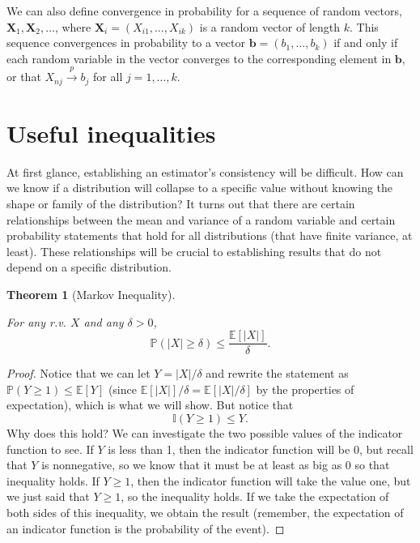 \documentclass[
  letterpaper,
  DIV=11,
  numbers=noendperiod]{scrreprt}
\newcommand{\mb}{\symbf}
\newcommand{\E}{\mathbb{E}}
\renewcommand{\P}{\mathbb{P}}
\newcommand{\X}{\mb{X}}
\newcommand{\inprob}{\overset{p}{\to}}
\theoremstyle{definition}
\theoremstyle{plain}
\newtheorem{theorem}{Theorem}[chapter]
\theoremstyle{definition}
\theoremstyle{remark}
\begin{document}
We can also define convergence in probability for a sequence of random
vectors, \(\X_1, \X_2, \ldots\), where
\(\X_i = (X_{i1}, \ldots, X_{ik})\) is a random vector of length \(k\).
This sequence convergences in probability to a vector
\(\mb{b} = (b_1, \ldots, b_k)\) if and only if each random variable in
the vector converges to the corresponding element in \(\mb{b}\), or that
\(X_{nj} \inprob b_j\) for all \(j = 1, \ldots, k\).

\hypertarget{useful-inequalities}{%
\section{Useful inequalities}\label{useful-inequalities}}

At first glance, establishing an estimator's consistency will be
difficult. How can we know if a distribution will collapse to a specific
value without knowing the shape or family of the distribution? It turns
out that there are certain relationships between the mean and variance
of a random variable and certain probability statements that hold for
all distributions (that have finite variance, at least). These
relationships will be crucial to establishing results that do not depend
on a specific distribution.

\begin{theorem}[Markov
Inequality]\protect\hypertarget{thm-markov}{}\label{thm-markov}

For any r.v. \(X\) and any \(\delta >0\), \[
\P(|X| \geq \delta) \leq \frac{\E[|X|]}{\delta}.
\]

\end{theorem}

\begin{proof}

Notice that we can let \(Y = |X|/\delta\) and rewrite the statement as
\(\P(Y \geq 1) \leq \E[Y]\) (since \(\E[|X|]/\delta = \E[|X|/\delta]\)
by the properties of expectation), which is what we will show. But
notice that \[
\mathbb{I}(Y \geq 1) \leq Y.
\] Why does this hold? We can investigate the two possible values of the
indicator function to see. If \(Y\) is less than 1, then the indicator
function will be 0, but recall that \(Y\) is nonnegative, so we know
that it must be at least as big as 0 so that inequality holds. If
\(Y \geq 1\), then the indicator function will take the value one, but
we just said that \(Y \geq 1\), so the inequality holds. If we take the
expectation of both sides of this inequality, we obtain the result
(remember, the expectation of an indicator function is the probability
of the event).

\end{proof}
\end{document}
